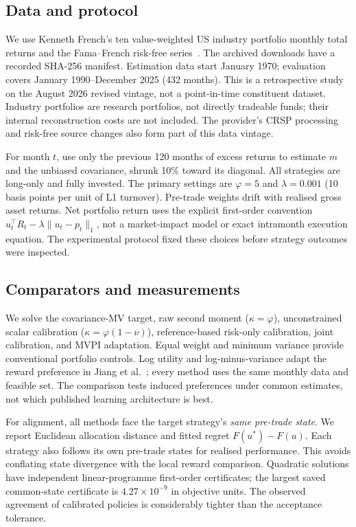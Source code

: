 \documentclass[sigconf,review]{acmart}
\begin{document}
\subsection{Data and protocol}
We use Kenneth French's ten value-weighted US industry portfolio monthly total returns and the Fama--French risk-free series\ \cite{french}. The archived downloads have a recorded SHA-256 manifest. Estimation data start January 1970; evaluation covers January 1990--December 2025 (432 months). This is a retrospective study on the August 2026 revised vintage, not a point-in-time constituent dataset. Industry portfolios are research portfolios, not directly tradeable funds; their internal reconstruction costs are not included. The provider's CRSP processing and risk-free source changes also form part of this data vintage.

For month $t$, use only the previous 120 months of excess returns to estimate $m$ and the unbiased covariance, shrunk 10\% toward its diagonal. All strategies are long-only and fully invested. The primary settings are $\varphi=5$ and $\lambda=0.001$ (10 basis points per unit of L1 turnover). Pre-trade weights drift with realised gross asset returns. Net portfolio return uses the explicit first-order convention $u_t^\top R_t-\lambda\|u_t-p_t\|_1$, not a market-impact model or exact intramonth execution equation. The experimental protocol fixed these choices before strategy outcomes were inspected.

\subsection{Comparators and measurements}
We solve the covariance-MV target, raw second moment ($\kappa=\varphi$), unconstrained scalar calibration ($\kappa=\varphi(1-\nu)$), reference-based risk-only calibration, joint calibration, and MVPI adaptation. Equal weight and minimum variance provide conventional portfolio controls. Log utility and log-minus-variance adapt the reward preference in Jiang et al.\ \cite{jiang2025}; every method uses the same monthly data and feasible set. The comparison tests induced preferences under common estimates, not which published learning architecture is best.

For alignment, all methods face the target strategy's \emph{same pre-trade state}. We report Euclidean allocation distance and fitted regret $F(u^*)-F(u)$. Each strategy also follows its own pre-trade states for realised performance. This avoids conflating state divergence with the local reward comparison. Quadratic solutions have independent linear-programme first-order certificates; the largest saved common-state certificate is $4.27\times10^{-9}$ in objective units. The observed agreement of calibrated policies is considerably tighter than the acceptance tolerance.
\end{document}
